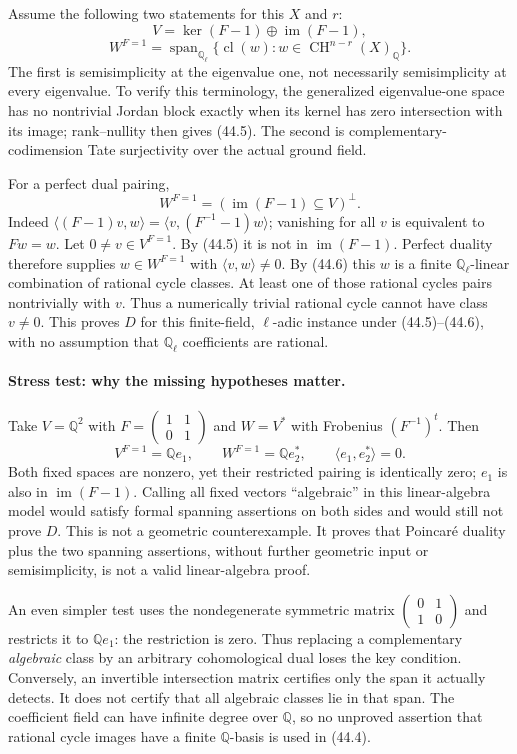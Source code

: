 \documentclass[11pt,a4paper]{article}
\newcommand{\Q}{\mathbb{Q}}
\numberwithin{equation}{section}
\begin{document}
Assume the following two statements for this $X$ and $r$:
\[
 V=\ker(F-1)\oplus\operatorname{im}(F-1), \tag{44.5}
\]
\[
 W^{F=1}=\operatorname{span}_{\Q_\ell}
 \{\operatorname{cl}(w):w\in\operatorname{CH}^{n-r}(X)_{\Q}\}.
 \tag{44.6}
\]
The first is semisimplicity at the eigenvalue one, not necessarily
semisimplicity at every eigenvalue. To verify this terminology, the
generalized eigenvalue-one space has no nontrivial Jordan block exactly
when its kernel has zero intersection with its image; rank--nullity then
gives (44.5). The second is complementary-codimension Tate surjectivity
over the actual ground field.

For a perfect dual pairing,
\[
 W^{F=1}=(\operatorname{im}(F-1)\subseteq V)^\perp.
 \tag{44.7}
\]
Indeed $\langle(F-1)v,w\rangle
=\langle v,(F^{-1}-1)w\rangle$; vanishing for all $v$ is equivalent
to $Fw=w$. Let $0\ne v\in V^{F=1}$. By (44.5) it is not in
$\operatorname{im}(F-1)$. Perfect duality therefore supplies
$w\in W^{F=1}$ with $\langle v,w\rangle\ne0$. By (44.6) this $w$
is a finite $\Q_\ell$-linear combination of rational cycle classes.
At least one of those rational cycles pairs nontrivially with $v$.
Thus a numerically trivial rational cycle cannot have class $v\ne0$.
This proves $D$ for this finite-field, $\ell$-adic instance under
(44.5)--(44.6), with no assumption that $\Q_\ell$ coefficients are
rational.

\paragraph{Stress test: why the missing hypotheses matter.}
Take $V=\Q^2$ with $F=\left(\begin{smallmatrix}1&1\\0&1\end{smallmatrix}\right)$
and $W=V^*$ with Frobenius $(F^{-1})^t$. Then
\[
 V^{F=1}=\Q e_1,\qquad W^{F=1}=\Q e_2^*,\qquad
 \langle e_1,e_2^*\rangle=0. \tag{44.8}
\]
Both fixed spaces are nonzero, yet their restricted pairing is identically
zero; $e_1$ is also in $\operatorname{im}(F-1)$. Calling all fixed
vectors ``algebraic'' in this linear-algebra model would satisfy formal
spanning assertions on both sides and would still not prove $D$.
This is not a geometric counterexample. It proves that Poincar\'e duality
plus the two spanning assertions, without further geometric input or
semisimplicity, is not a valid linear-algebra proof.

An even simpler test uses the nondegenerate symmetric matrix
$\left(\begin{smallmatrix}0&1\\1&0\end{smallmatrix}\right)$ and restricts
it to $\Q e_1$: the restriction is zero. Thus replacing a complementary
\emph{algebraic} class by an arbitrary cohomological dual loses the key
condition. Conversely, an invertible intersection matrix certifies only
the span it actually detects. It does not certify that all algebraic
classes lie in that span. The coefficient field can have infinite degree
over $\Q$, so no unproved assertion that rational cycle images have a
finite $\Q$-basis is used in (44.4).
\end{document}
